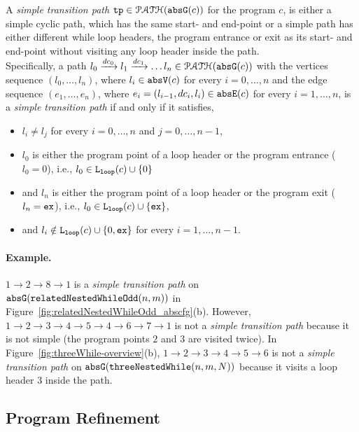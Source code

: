 \begin{defn}
  \label{def:tpath}
A \emph{simple transition path}
$\mathtt{tp} \in \mathcal{PATH}(\mathtt{abs}{\mathtt{G}}(c))$ for the program $c$, is either a simple cyclic path, which has the same start- and end-point
or a simple path has either different while loop headers, the program entrance or exit as its start- and end-point
without visiting any loop header inside the path.
\\
Specifically, a path $l_0 \xrightarrow{dc_0} l_1 \xrightarrow{dc_1} \ldots l_n \in \mathcal{PATH}(\mathtt{abs}{\mathtt{G}}(c))$ with the
vertices sequence $(l_0, \ldots, l_n)$, where $l_i \in \mathtt{abs}{\mathtt{V}}(c)$ for every $i = 0, \ldots, n$ and
%
the edge sequence $(e_1, \ldots, e_n)$, where $e_i = (l_{i - 1}, dc_i, l_{i}) \in \mathtt{abs}{\mathtt{E}}(c)$ for every $i = 1, \ldots, n$,
%
is a \emph{simple transition path} if and only if it satisfies,
\begin{itemize}
  \item $l_i \neq l_j$ for every $i = 0, \ldots, n$ and $j = 0, \ldots, {n - 1}$,
  \item $l_0$ is either the program point of a loop header or the program entrance ($l_0 = 0$),
  i.e., $l_0 \in \mathtt{L}_{\mathtt{loop}}(c) \cup \{ 0 \}$
  \item and $l_n$ is either the program point of a loop header or the program exit ($l_n = \mathtt{ex}$),
  i.e., $l_0 \in \mathtt{L}_{\mathtt{loop}}(c) \cup \{ \mathtt{ex} \}$,
  \item and $l_i \notin \mathtt{L}_{\mathtt{loop}}(c) \cup \{ 0, \mathtt{ex} \}$ for every $i = 1, \ldots, n-1$.
\end{itemize}
\end{defn}


\paragraph{Example.}
$1 \to 2 \to 8 \to 1$ is a \emph{simple transition path} on $\mathtt{abs}{\mathtt{G}}(\mathtt{relatedNestedWhileOdd}(n, m))$ in Figure~\ref{fig:relatedNestedWhileOdd_abscfg}(b).
However, $1 \to 2 \to 3 \to 4 \to 5 \to 4 \to 6 \to 7 \to 1$ is not a \emph{simple transition path} because it is not simple (the program points $2$ and $3$ are visited twice).
In Figure~\ref{fig:threeWhile-overview}(b), $1 \to 2 \to 3 \to 4 \to 5 \to 6$ is not a \emph{simple transition path} on $\mathtt{abs}{\mathtt{G}}(\mathtt{threeNestedWhile}(n, m, N))$ because it visits a loop header $3$ inside the path.

\subsection{Program Refinement}
